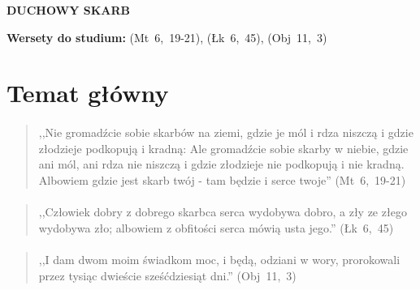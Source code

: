 \documentclass[10pt,a4paper,oneside]{article}
\begin{document}
\centerline{\textbf{\MakeUppercase{Duchowy skarb}}}
\begin{center}
\textbf{Wersety do studium:} \mbox{(Mt 6, 19-21)}, \mbox{(Łk 6, 45)}, \mbox{(Obj 11, 3)}
\end{center}
\section{Temat główny}
\paragraph{}
\begin{quote}
,,Nie gromadźcie sobie skarbów na ziemi, gdzie je mól i rdza niszczą i gdzie złodzieje podkopują i kradną: Ale gromadźcie sobie skarby w niebie, gdzie ani mól, ani rdza nie niszczą i gdzie złodzieje nie podkopują i nie kradną. Albowiem gdzie jest skarb twój - tam będzie i serce twoje'' \mbox{(Mt 6, 19-21)}
\end{quote}
\paragraph{}
\begin{quote}
,,Człowiek dobry z dobrego skarbca serca wydobywa dobro, a zły ze złego wydobywa zło; albowiem z obfitości serca mówią usta jego.'' \mbox{(Łk 6, 45)}
\end{quote}
\paragraph{}
\begin{quote}
,,I dam dwom moim świadkom moc, i będą, odziani w wory, prorokowali przez tysiąc dwieście sześćdziesiąt dni.'' \mbox{(Obj 11, 3)}
\end{quote}
\end{document}
